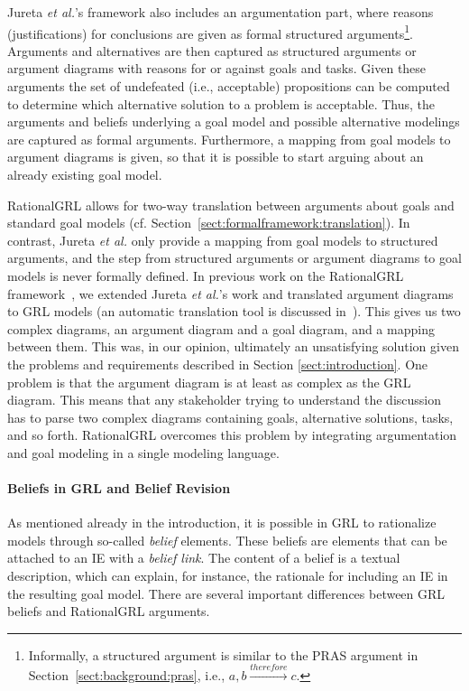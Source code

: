 Jureta \emph{et al.}'s framework also includes an argumentation part, where reasons (justifications) for conclusions are given as formal structured arguments\footnote{Informally, a structured argument is similar to the PRAS argument in Section~\ref{sect:background:pras}, i.e., $a, b \xrightarrow{therefore} c$.}. Arguments and alternatives are then captured as structured arguments or argument diagrams with reasons for or against goals and tasks. Given these arguments the set of undefeated (i.e., acceptable) propositions can be computed to determine which alternative solution to a problem is acceptable. Thus, the arguments and beliefs underlying a goal model and possible alternative modelings are captured as formal arguments. Furthermore, a mapping from goal models to argument diagrams is given, so that it is possible to start arguing about an already existing goal model.

RationalGRL allows for two-way translation between arguments about goals and standard goal models (cf. Section~\ref{sect:formalframework:translation}). In contrast, Jureta \emph{et al.} only provide a mapping from goal models to structured arguments, and the step from structured arguments or argument diagrams to goal models is never formally defined. In previous work on the RationalGRL framework~\cite{vanzee-etal:renext2015,vanZee-etal:er2016}, we extended Jureta \emph{et al.}'s work and translated argument diagrams to GRL models (an automatic translation tool is discussed in~\cite{vanZee-etal:er2016}). This gives us two complex diagrams, an argument diagram and a goal diagram, and a mapping between them. This was, in our opinion, ultimately an unsatisfying solution given the problems and requirements described in Section \ref{sect:introduction}. One problem is that the argument diagram is at least as complex as the GRL diagram. This means that any stakeholder trying to understand the discussion has to parse two complex diagrams containing goals, alternative solutions, tasks, and so forth. RationalGRL overcomes this problem by integrating argumentation and goal modeling in a single modeling language.

\paragraph{Beliefs in GRL and Belief Revision} As mentioned already in the introduction, it is possible in GRL to rationalize models
through so-called \emph{belief} elements. These beliefs are elements that can be attached to an IE with a \emph{belief link}. The content of a belief is a textual description, which can explain, for instance, the rationale for including an IE in the resulting goal model. There are several important differences between GRL beliefs and RationalGRL arguments.

